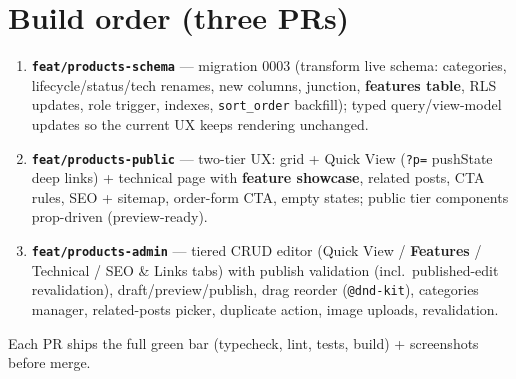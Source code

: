\documentclass[11pt,a4paper]{article}
\begin{document}
\section{Build order (three PRs)}
\begin{enumerate}
  \item \textbf{\texttt{feat/products-schema}} --- migration 0003 (transform live schema:
        categories, lifecycle/status/tech renames, new columns, junction, \textbf{features
        table}, RLS updates, role trigger, indexes, \texttt{sort\_order} backfill); typed
        query/view-model updates so the current UX keeps rendering unchanged.
  \item \textbf{\texttt{feat/products-public}} --- two-tier UX: grid + Quick View
        (\texttt{?p=} pushState deep links) + technical page with \textbf{feature showcase},
        related posts, CTA rules, SEO + sitemap, order-form CTA, empty states; public tier
        components prop-driven (preview-ready).
  \item \textbf{\texttt{feat/products-admin}} --- tiered CRUD editor (Quick View /
        \textbf{Features} / Technical / SEO \& Links tabs) with publish validation (incl.\
        published-edit revalidation), draft/preview/publish, drag reorder
        (\texttt{@dnd-kit}), categories manager, related-posts picker, duplicate action,
        image uploads, revalidation.
\end{enumerate}

Each PR ships the full green bar (typecheck, lint, tests, build) + screenshots before merge.
\end{document}
